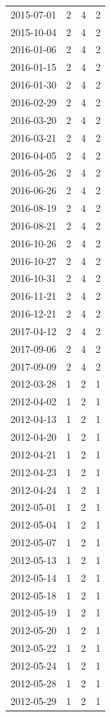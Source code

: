 \begin{tabular}{lrrr}
2015-07-01 & 2 & 4 & 2 \\
2015-10-04 & 2 & 4 & 2 \\
2016-01-06 & 2 & 4 & 2 \\
2016-01-15 & 2 & 4 & 2 \\
2016-01-30 & 2 & 4 & 2 \\
2016-02-29 & 2 & 4 & 2 \\
2016-03-20 & 2 & 4 & 2 \\
2016-03-21 & 2 & 4 & 2 \\
2016-04-05 & 2 & 4 & 2 \\
2016-05-26 & 2 & 4 & 2 \\
2016-06-26 & 2 & 4 & 2 \\
2016-08-19 & 2 & 4 & 2 \\
2016-08-21 & 2 & 4 & 2 \\
2016-10-26 & 2 & 4 & 2 \\
2016-10-27 & 2 & 4 & 2 \\
2016-10-31 & 2 & 4 & 2 \\
2016-11-21 & 2 & 4 & 2 \\
2016-12-21 & 2 & 4 & 2 \\
2017-04-12 & 2 & 4 & 2 \\
2017-09-06 & 2 & 4 & 2 \\
2017-09-09 & 2 & 4 & 2 \\
2012-03-28 & 1 & 2 & 1 \\
2012-04-02 & 1 & 2 & 1 \\
2012-04-13 & 1 & 2 & 1 \\
2012-04-20 & 1 & 2 & 1 \\
2012-04-21 & 1 & 2 & 1 \\
2012-04-23 & 1 & 2 & 1 \\
2012-04-24 & 1 & 2 & 1 \\
2012-05-01 & 1 & 2 & 1 \\
2012-05-04 & 1 & 2 & 1 \\
2012-05-07 & 1 & 2 & 1 \\
2012-05-13 & 1 & 2 & 1 \\
2012-05-14 & 1 & 2 & 1 \\
2012-05-18 & 1 & 2 & 1 \\
2012-05-19 & 1 & 2 & 1 \\
2012-05-20 & 1 & 2 & 1 \\
2012-05-22 & 1 & 2 & 1 \\
2012-05-24 & 1 & 2 & 1 \\
2012-05-28 & 1 & 2 & 1 \\
2012-05-29 & 1 & 2 & 1 \\

\end{tabular}
